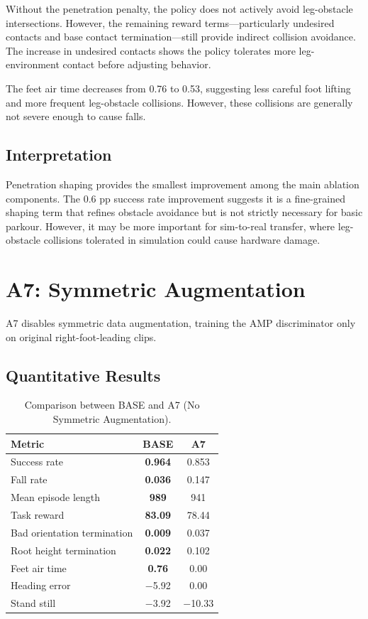 Without the penetration penalty, the policy does not actively avoid leg-obstacle intersections. However, the remaining reward terms---particularly undesired contacts and base contact termination---still provide indirect collision avoidance. The increase in undesired contacts shows the policy tolerates more leg-environment contact before adjusting behavior.

The feet air time decreases from 0.76 to 0.53, suggesting less careful foot lifting and more frequent leg-obstacle collisions. However, these collisions are generally not severe enough to cause falls.

\subsection{Interpretation}

Penetration shaping provides the smallest improvement among the main ablation components. The 0.6 pp success rate improvement suggests it is a fine-grained shaping term that refines obstacle avoidance but is not strictly necessary for basic parkour. However, it may be more important for sim-to-real transfer, where leg-obstacle collisions tolerated in simulation could cause hardware damage.

\section{A7: Symmetric Augmentation}
\label{sec:ablation_sym_aug}

A7 disables symmetric data augmentation, training the AMP discriminator only on original right-foot-leading clips.

\subsection{Quantitative Results}

\begin{table}[t]
\centering
\caption{Comparison between BASE and A7 (No Symmetric Augmentation).}
\label{tab:a7_results}
\begin{tabular}{lcc}
\toprule
\textbf{Metric} & \textbf{BASE} & \textbf{A7} \\
\midrule
Success rate & \textbf{0.964} & 0.853 \\
Fall rate & \textbf{0.036} & 0.147 \\
Mean episode length & \textbf{989} & 941 \\
Task reward & \textbf{83.09} & 78.44 \\
Bad orientation termination & \textbf{0.009} & 0.037 \\
Root height termination & \textbf{0.022} & 0.102 \\
Feet air time & \textbf{0.76} & 0.00 \\
Heading error & $-$5.92 & 0.00 \\
Stand still & $-$3.92 & $-$10.33 \\
\bottomrule
\end{tabular}
\end{table}

